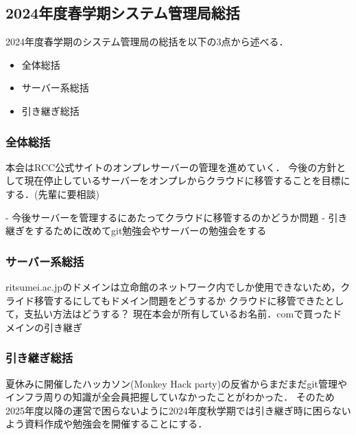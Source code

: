 \subsection*{2024年度春学期システム管理局総括}


2024年度春学期のシステム管理局の総括を以下の3点から述べる．
\begin{itemize}
    \item 全体総括
    \item サーバー系総括
    \item 引き継ぎ総括
\end{itemize}

\subsubsection*{全体総括}
本会はRCC公式サイトのオンプレサーバーの管理を進めていく．
今後の方針として現在停止しているサーバーをオンプレからクラウドに移管することを目標にする．(先輩に要相談)

- 今後サーバーを管理するにあたってクラウドに移管するのかどうか問題
- 引き継ぎをするために改めてgit勉強会やサーバーの勉強会をする

\subsubsection*{サーバー系総括}
ritsumei.ac.jpのドメインは立命館のネットワーク内でしか使用できないため，クライド移管するにしてもドメイン問題をどうするか
クラウドに移管できたとして，支払い方法はどうする？
現在本会が所有しているお名前．comで買ったドメインの引き継ぎ

\subsubsection*{引き継ぎ総括}
夏休みに開催したハッカソン(Monkey Hack party)の反省からまだまだgit管理やインフラ周りの知識が全会員把握していなかったことがわかった．
そのため2025年度以降の運営で困らないように2024年度秋学期では引き継ぎ時に困らないよう資料作成や勉強会を開催することにする．
